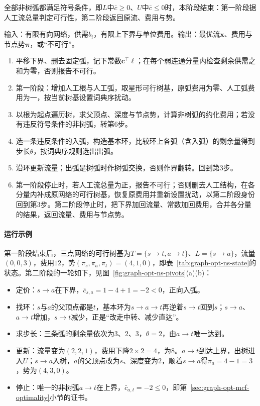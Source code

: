 全部非树弧都满足符号条件，即$L$中$\bar c\geq0$、$U$中$\bar c\leq0$时，本阶段结束：第一阶段据人工流总量判定可行性，第二阶段返回原流、费用与势。

\begin{algorithm}[网络单纯形法]
\label{alg:graph-opt-network-simplex}
输入：有限有向网络，供需$b_i$，有限上下界与单位费用。输出：最优流$\bm x$、费用与节点势$\bm\pi$，或“不可行”。
\begin{enumerate}
  \item 平移下界、删去固定弧，记下常数$\bm c^{\top}\bm\ell$；在每个弱连通分量内检查剩余供需之和为零，否则报告不可行。
  \item 第一阶段：增加人工根与人工弧，取星形可行树基，原弧费用为零、人工弧费用为一，按当前树基设置词典序扰动。
  \item 以根为起点遍历树，求父顶点、深度与节点势，计算非树弧的约化费用；若没有违反符号条件的非树弧，转第6步。
  \item 选一条违反条件的入弧，构造基本环，比较环上各弧（含入弧）的剩余量得到步长$\theta$，按词典序规则选出出弧。
  \item 沿环更新流量；出弧是树弧时作树弧交换，否则作界翻转。回到第3步。
  \item 第一阶段停止时，若人工流总量为正，报告不可行；否则删去人工结构，在各分量内补成原网络的可行树基，恢复原费用并重新设置扰动，以第二阶段身份回到第3步。第二阶段停止时，把下界加回流量、常数加回费用，合并各分量的结果，返回流量、费用与节点势。
\end{enumerate}
\end{algorithm}

\paragraph{运行示例}
第一阶段结束后，三点网络的可行树基为$T=\{s\to t,a\to t\}$、$L=\{s\to a\}$，流量$(0,0,3)$，费用$12$，势$(\pi_s,\pi_a,\pi_t)=(4,1,0)$，即表~\ref{tab:graph-opt-ns-state}的状态。第二阶段的一轮如下，见图~\ref{fig:graph-opt-ns-pivots}(a)(b)：
\begin{itemize}
  \item 定价：$s\to a$在下界，$\bar c_{s,a}=1-4+1=-2<0$，正向入弧。
  \item 找环：$s$与$a$的父顶点都是$t$，基本环为$s\to a\to t$再逆着$s\to t$回到$s$；$s\to a$、$a\to t$增加，$s\to t$减少，正是“改走中转、减少直达”。
  \item 求步长：三条弧的剩余量依次为$3$、$2$、$3$，$\theta=2$，由$a\to t$唯一达到。
  \item 更新：流量变为$(2,2,1)$，费用下降$2\times2=4$，为$8$。$a\to t$到达上界，出树进入$U$；$s\to a$入树，$a$的父顶点改为$s$、深度变为$2$，顺着$s\to a$得$\pi_a=4-1=3$，势为$(4,3,0)$。
  \item 停止：唯一的非树弧$a\to t$在上界，$\bar c_{a,t}=-2\leq0$，即第~\ref{sec:graph-opt-mcf-optimality}小节的证书。
\end{itemize}

